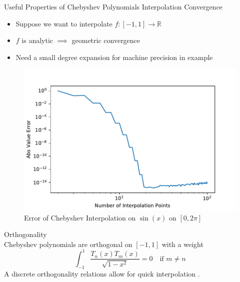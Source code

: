\documentclass[final]{beamer}
\begin{document}
\begin{frame}[fragile]{}
\begin{columns}[t]
\begin{column}{.31\linewidth}
\begin{block}{Useful Properties of Chebyshev Polynomials}
{\color{numhypRed} Interpolation Convergence \cite[Ch.\ 8]{trefethen_2012}}\\    %
\begin{minipage}{.45\textwidth}
\vspace{-20mm}
\begin{itemize}
\item Suppose we want to interpolate $f:[-1,1]\to \mathbb{R}$
\item $f$ is analytic $\implies$ geometric convergence 
\item Need a small degree expansion for machine precision in example
\end{itemize}
\end{minipage}
\begin{minipage}{.5\textwidth}
\begin{figure}
\includegraphics[width=\textwidth]{sine_error.pdf}
\caption{Error of Chebyshev Interpolation on $\sin(x)$ on $[0,2\pi]$}
\end{figure}
\end{minipage}
{\color{numhypRed} Orthogonality}\\
Chebyshev polynomials are orthogonal on $[-1,1]$ with a weight
$$\int_{-1}^{1}\frac{T_n(x)T_m(x)}{\sqrt{1-x^2}} = 0 \quad \text{if $m\neq n$}$$
A discrete orthogonality relations allow for quick interpolation \cite[Sec.\ 6.3]{mason_2003}.
\end{block}


\end{column}
\end{columns}
\end{frame}
\end{document}

